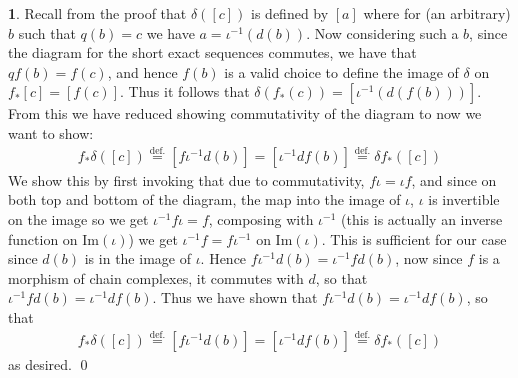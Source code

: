 \documentclass[10.5pt]{article}
\theoremstyle{definition}
\newtheorem{pb}{}
\begin{document}
\begin{pb}
        Recall from the proof that \(\delta([c])\) is defined by \([a]\) where for (an arbitrary) \(b\) such that \(q(b) = c\) we have \(a = \iota^{-1}(d(b))\). Now considering such a \(b\), since the diagram for the short exact sequences commutes, we have that \(qf(b) = f(c)\), and hence \(f(b)\) is a valid choice to define the image of \(\delta\) on \(f_*[c] = [f(c)]\). Thus it follows that \(\delta(f_*(c)) = [\iota^{-1}(d(f(b)))]\). From this we have reduced showing commutativity of the diagram to now we want to show:
        \begin{align*}
            f_*\delta([c]) \overset{\text{def.}}{=} [f\iota^{-1}d(b)] = [\iota^{-1}df(b)] \overset{\text{def.}}{=} \delta f_*([c])
        \end{align*}
        We show this by first invoking that due to commutativity, \(f\iota = \iota f\), and since on both top and bottom of the diagram, the map into the image of \(\iota\), \(\iota\) is invertible on the image so we get \(\iota^{-1}f\iota = f\), composing with \(\iota^{-1}\) (this is actually an inverse function on \(\text{Im}(\iota)\)) we get \(\iota^{-1}f = f\iota^{-1}\) on \(\text{Im}(\iota)\). This is sufficient for our case since \(d(b)\) is in the image of \(\iota\). Hence \(f\iota^{-1}d(b) = \iota^{-1}fd(b)\), now since \(f\) is a morphism of chain complexes, it commutes with \(d\), so that \(\iota^{-1}fd(b) = \iota^{-1}df(b)\). Thus we have shown that \(f\iota^{-1}d(b) = \iota^{-1}df(b)\), so that
        \begin{align*}
            f_*\delta([c]) \overset{\text{def.}}{=} [f\iota^{-1}d(b)] = [\iota^{-1}df(b)] \overset{\text{def.}}{=} \delta f_*([c])
        \end{align*}
        as desired. \qed
    \end{pb}
\end{document}
